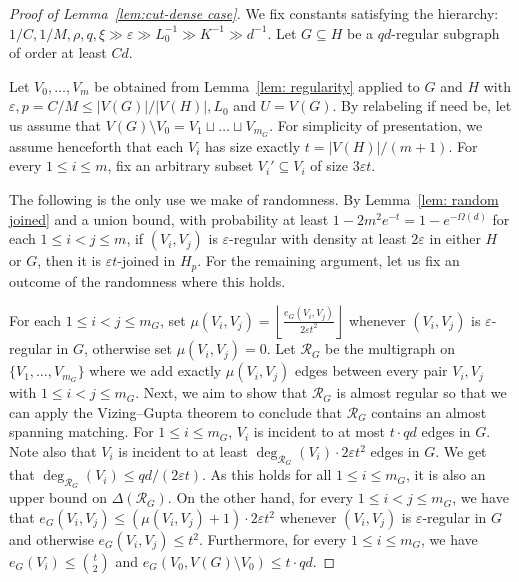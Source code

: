 \documentclass[10pt,a4paper]{amsart}
\begin{document}
\begin{proof}[Proof of Lemma~\ref{lem:cut-dense case}]
We fix constants satisfying the hierarchy: $1/C,1/M,\rho,q,\xi \gg \varepsilon \gg L_0^{-1} \gg K^{-1} \gg d^{-1}$. Let $G\subseteq H$ be a $qd$-regular subgraph of order at least $Cd$.

Let $V_0,\ldots,V_m$ be obtained from Lemma~\ref{lem: regularity} applied to $G$ and $H$ with $\varepsilon, p=C/M\leq |V(G)|/|V(H)|, L_0$ and $U=V(G)$. By relabeling if need be, let us assume that $V(G)\setminus V_0=V_1\sqcup\ldots\sqcup V_{m_G}$. For simplicity of presentation, we assume henceforth that each $V_i$ has size exactly $t=|V(H)|/(m+1)$. For every $1\leq i\leq m$, fix an arbitrary subset $V_i'\subseteq V_i$ of size $3\varepsilon t$.

The following is the only use we make of randomness. By Lemma~\ref{lem: random joined} and a union bound, with probability at least $1-2m^2e^{-t}=1-e^{-\Omega(d)}$ for each $1\leq i<j\leq m$, if $(V_i,V_j)$ is $\varepsilon$-regular with density at least $2\varepsilon$ in either $H$ or $G$, then it is $\varepsilon t$-joined in $H_p$. For the remaining argument, let us fix an outcome of the randomness where this holds.

For each $1\leq i<j\leq m_G$, set $\mu(V_i,V_j)=\left\lfloor\frac{e_G(V_i,V_j)}{2\varepsilon t^2}\right\rfloor$ whenever $(V_i,V_j)$ is $\varepsilon$-regular in $G$, otherwise set $\mu(V_i,V_j)=0$. Let $\mathcal R_G$ be the multigraph on $\{V_1,\ldots,V_{m_G}\}$ where we add exactly $\mu(V_i,V_j)$ edges between every pair $V_i,V_j$ with $1\leq i<j\leq m_G$. Next, we aim to show that $\mathcal R_G$ is almost regular so that we can apply the Vizing--Gupta theorem to conclude that $\mathcal R_G$ contains an almost spanning matching. For $1\leq i\leq m_G$, $V_i$ is incident to at most $t\cdot qd$ edges in $G$. Note also that $V_i$ is incident to at least $\deg_{\mathcal{R}_G}(V_i)\cdot 2\varepsilon t^2$ edges in $G$. We get that $\deg_{\mathcal{R}_G}(V_i)\leq qd/(2\varepsilon t)$. As this holds for all $1\leq i\leq m_G$, it is also an upper bound on $\Delta(\mathcal{R}_G)$. On the other hand, for every $1\leq i<j\leq m_G$, we have that $e_G(V_i,V_j)\leq(\mu(V_i,V_j)+1)\cdot 2\varepsilon t^2$ whenever $(V_i,V_j)$ is $\varepsilon$-regular in $G$ and otherwise $e_G(V_i,V_j)\leq t^2$. Furthermore, for every $1\leq i\leq m_G$, we have $e_G(V_i)\leq \binom{t}{2}$ and $e_G(V_0,V(G)\setminus V_0)\leq t\cdot qd$.


\end{proof}
\end{document}
